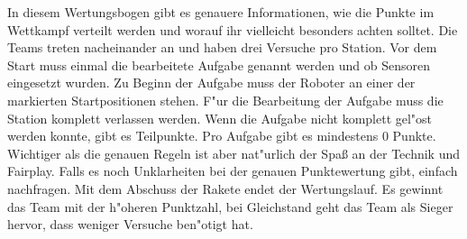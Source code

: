 \documentclass[
    DIV=calc,
    IMRAD=false,
	ngerman,
	accentcolor=1c,%
	]{tudapub}
\begin{document}
\bigskip
In diesem Wertungsbogen gibt es genauere Informationen, wie die Punkte im Wettkampf verteilt werden und worauf ihr vielleicht besonders achten solltet.
Die Teams treten nacheinander an und haben drei Versuche pro Station.
Vor dem Start muss einmal die bearbeitete Aufgabe genannt werden und ob Sensoren eingesetzt wurden.
Zu Beginn der Aufgabe muss der Roboter an einer der markierten Startpositionen stehen. F"ur die Bearbeitung der Aufgabe muss die Station komplett verlassen werden.
Wenn die Aufgabe nicht komplett gel"ost werden konnte, gibt es Teilpunkte. Pro Aufgabe gibt es mindestens 0 Punkte.\\
Wichtiger als die genauen Regeln ist aber nat"urlich der Spa\ss{} an der Technik und Fairplay.
Falls es noch Unklarheiten bei der genauen Punktewertung gibt, einfach nachfragen.
Mit dem Abschuss der Rakete endet der Wertungslauf.
Es gewinnt das Team mit der h"oheren Punktzahl, bei Gleichstand geht das Team als Sieger hervor, dass weniger Versuche ben"otigt hat.\\
\end{document}
